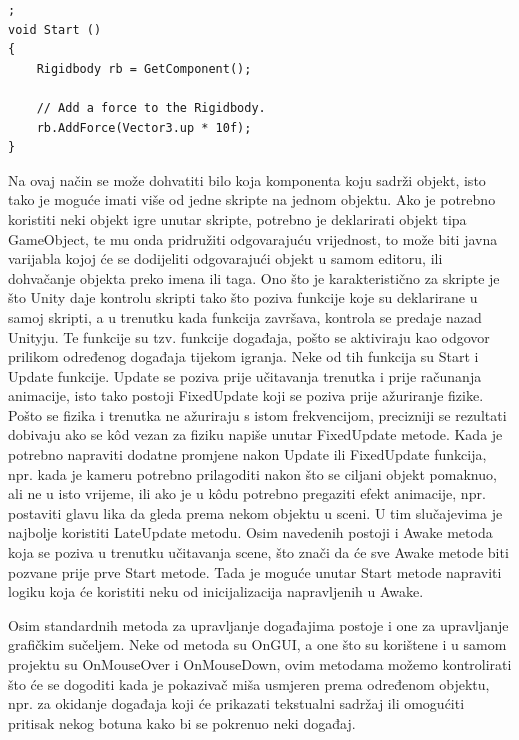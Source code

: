 \begin{lstlisting}[caption={Dodavanje javne varijable}, label=GetComponent];
void Start ()
{
    Rigidbody rb = GetComponent();
    
    // Add a force to the Rigidbody.
    rb.AddForce(Vector3.up * 10f);
}
\end{lstlisting}
Na ovaj način se može dohvatiti bilo koja komponenta koju sadrži objekt, isto tako je moguće imati više od jedne skripte na jednom objektu. Ako je potrebno koristiti neki objekt igre unutar skripte, potrebno je deklarirati objekt tipa GameObject, te mu onda pridružiti odgovarajuću vrijednost, to može biti javna varijabla kojoj će se dodijeliti odgovarajući objekt u samom editoru, ili dohvačanje objekta preko imena ili taga.
Ono što je karakteristično za skripte je što Unity daje kontrolu skripti tako što poziva funkcije koje su deklarirane u samoj skripti, a u trenutku kada funkcija završava, kontrola se predaje nazad Unityju. Te funkcije su tzv. funkcije događaja, pošto se aktiviraju kao odgovor prilikom određenog događaja tijekom igranja. Neke od tih funkcija su Start i Update funkcije. Update se poziva prije učitavanja trenutka i prije računanja animacije, isto tako postoji FixedUpdate koji se poziva prije ažuriranje fizike. Pošto se fizika i trenutka ne ažuriraju s istom frekvencijom, precizniji se rezultati dobivaju ako se k\^od vezan za fiziku napiše unutar FixedUpdate metode. Kada je potrebno napraviti dodatne promjene nakon Update ili FixedUpdate funkcija, npr. kada je kameru potrebno prilagoditi nakon što se ciljani objekt pomaknuo, ali ne u isto vrijeme, ili ako je u k\^odu potrebno pregaziti efekt animacije, npr. postaviti glavu lika da gleda prema nekom objektu u sceni. U tim slučajevima je najbolje koristiti LateUpdate metodu. Osim navedenih postoji i Awake metoda koja se poziva u trenutku učitavanja scene, što znači da će sve Awake metode biti pozvane prije prve Start metode. Tada je moguće unutar Start metode napraviti logiku koja će koristiti neku od inicijalizacija napravljenih u Awake.

Osim standardnih metoda za upravljanje događajima postoje i one za upravljanje grafičkim sučeljem. Neke od metoda su OnGUI, a one što su korištene i u samom projektu su OnMouseOver i OnMouseDown, ovim metodama možemo kontrolirati što će se dogoditi kada je pokazivač miša usmjeren prema određenom objektu, npr. za okidanje događaja koji će prikazati tekstualni sadržaj ili omogućiti pritisak nekog botuna kako bi se pokrenuo neki događaj.

